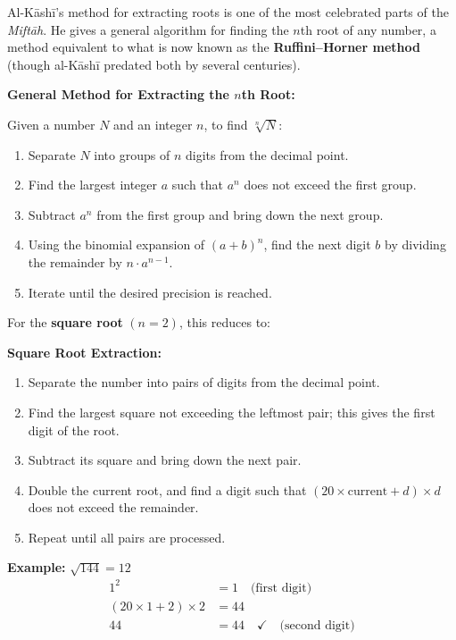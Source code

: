 \documentclass[11pt,a4paper]{article}
\newenvironment{mathalgo}{%
  \par\vspace{0.3cm}
  \begin{framed}
  \setlength{\parindent}{0pt}
}{%
  \end{framed}
  \par\vspace{0.3cm}
}
\begin{document}
\vspace{0.3cm}

Al-K\=ash\=i's method for extracting roots is one of the most celebrated
parts of the \textit{Mift\=ah}. He gives a general algorithm for finding
the $n$th root of any number, a method equivalent to what is now known
as the \textbf{Ruffini--Horner method} (though al-K\=ash\=i predated both by
several centuries).

\begin{mathalgo}
\textbf{General Method for Extracting the $n$th Root:}

Given a number $N$ and an integer $n$, to find $\sqrt[n]{N}$:
\begin{enumerate}[nosep]
  \item Separate $N$ into groups of $n$ digits from the decimal point.
  \item Find the largest integer $a$ such that $a^n$ does not exceed the
  first group.
  \item Subtract $a^n$ from the first group and bring down the next
  group.
  \item Using the binomial expansion of $(a + b)^n$, find the next digit
  $b$ by dividing the remainder by $n \cdot a^{n-1}$.
  \item Iterate until the desired precision is reached.
\end{enumerate}
\end{mathalgo}

\noindent For the \textbf{square root} $(n=2)$, this reduces to:

\begin{mathalgo}
\textbf{Square Root Extraction:}
\begin{enumerate}[nosep]
  \item Separate the number into pairs of digits from the decimal point.
  \item Find the largest square not exceeding the leftmost pair; this
  gives the first digit of the root.
  \item Subtract its square and bring down the next pair.
  \item Double the current root, and find a digit such that
  $(20 \times \text{current} + d) \times d$ does not exceed the remainder.
  \item Repeat until all pairs are processed.
\end{enumerate}
\end{mathalgo}

\noindent\textbf{Example:} $\sqrt{144} = 12$
\begin{align*}
1^2 &= 1 \quad \text{(first digit)} \\
(20 \times 1 + 2) \times 2 &= 44 \\
44 &= 44 \quad \checkmark \quad \text{(second digit)}
\end{align*}
\end{document}
